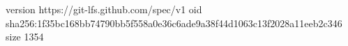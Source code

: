 version https://git-lfs.github.com/spec/v1
oid sha256:1f35bc168bb74790bb5f558a0e36c6ade9a38f44d1063c13f2028a11eeb2c346
size 1354
